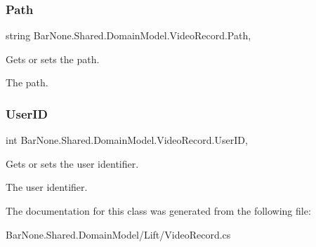\subsubsection{\texorpdfstring{Path}{Path}}
{\footnotesize\ttfamily string Bar\+None.\+Shared.\+Domain\+Model.\+Video\+Record.\+Path\hspace{0.3cm}{\ttfamily [get]}, {\ttfamily [set]}}



Gets or sets the path. 

The path. \mbox{\label{class_bar_none_1_1_shared_1_1_domain_model_1_1_video_record_a36d21060cce09c7d4e4d116b8ec0ecf2}} 
\subsubsection{\texorpdfstring{User\+ID}{UserID}}
{\footnotesize\ttfamily int Bar\+None.\+Shared.\+Domain\+Model.\+Video\+Record.\+User\+ID\hspace{0.3cm}{\ttfamily [get]}, {\ttfamily [set]}}



Gets or sets the user identifier. 

The user identifier. 

The documentation for this class was generated from the following file\+:\begin{DoxyCompactItemize}
\item 
Bar\+None.\+Shared.\+Domain\+Model/\+Lift/Video\+Record.\+cs\end{DoxyCompactItemize}
